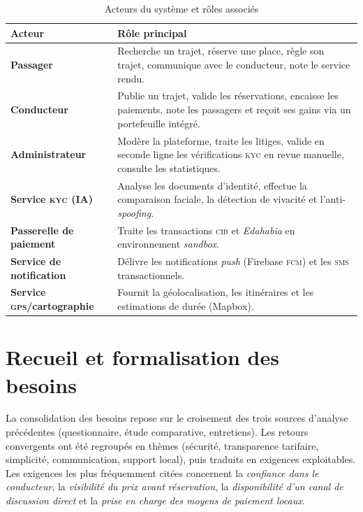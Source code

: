 \documentclass[12pt, a4paper, oneside]{report}
\begin{document}
\begin{table}[H]
\centering
\begin{tabularx}{\textwidth}{|l|X|}
\hline
\rowcolor{rohlight}
\textbf{Acteur} & \textbf{Rôle principal} \\
\hline
\textbf{Passager} & Recherche un trajet, réserve une place, règle son trajet, communique avec le conducteur, note le service rendu. \\
\hline
\textbf{Conducteur} & Publie un trajet, valide les réservations, encaisse les paiements, note les passagers et reçoit ses gains via un portefeuille intégré. \\
\hline
\textbf{Administrateur} & Modère la plateforme, traite les litiges, valide en seconde ligne les vérifications \textsc{kyc} en revue manuelle, consulte les statistiques. \\
\hline
\textbf{Service \textsc{kyc} (IA)} & Analyse les documents d'identité, effectue la comparaison faciale, la détection de vivacité et l'anti-\textit{spoofing}. \\
\hline
\textbf{Passerelle de paiement} & Traite les transactions \textsc{cib} et \textit{Edahabia} en environnement \textit{sandbox}. \\
\hline
\textbf{Service de notification} & Délivre les notifications \textit{push} (Firebase \textsc{fcm}) et les \textsc{sms} transactionnels. \\
\hline
\textbf{Service \textsc{gps}/cartographie} & Fournit la géolocalisation, les itinéraires et les estimations de durée (Mapbox). \\
\hline
\end{tabularx}
  \caption{Acteurs du système et rôles associés}
  \label{tab:acteurs}
\end{table}

\section{Recueil et formalisation des besoins}
\label{sec:recueil-besoins}

La consolidation des besoins repose sur le croisement des trois sources d'analyse précédentes (questionnaire, étude comparative, entretiens). Les retours convergents ont été regroupés en thèmes (sécurité, transparence tarifaire, simplicité, communication, support local), puis traduits en exigences exploitables. Les exigences les plus fréquemment citées concernent la \textit{confiance dans le conducteur}, la \textit{visibilité du prix avant réservation}, la \textit{disponibilité d'un canal de discussion direct} et la \textit{prise en charge des moyens de paiement locaux}.
\end{document}

